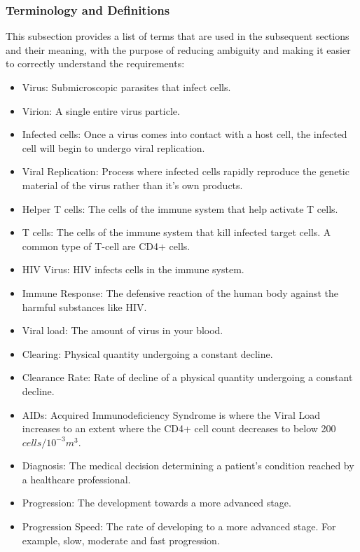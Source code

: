 \documentclass[12pt]{article}
\begin{document}
\subsubsection{Terminology and Definitions}

This subsection provides a list of terms that are used in the subsequent
sections and their meaning, with the purpose of reducing ambiguity and making it
easier to correctly understand the requirements:

\begin{itemize}
\item Virus: Submicroscopic parasites that infect cells. 
\item Virion: A single entire virus particle.
\item Infected cells: Once a virus comes into contact with a host cell, the 
infected cell will begin to undergo viral replication.
\item Viral Replication: Process where infected cells rapidly reproduce the 
genetic material of the virus rather than it’s own 
products\citep{BURRELL201739}.
\item Helper T cells: The cells of the immune system that help activate T cells.
\item T cells: The cells of the immune system that kill infected target cells. A 
common type of T-cell are CD4+ cells.
\citep{william_2018}
\item HIV Virus: HIV infects cells in the immune system.
\item Immune Response: The defensive reaction of the human body against the 
harmful substances like HIV.
\item Viral load:  The amount of virus in your blood.
\item Clearing: Physical quantity undergoing a constant decline.
\item Clearance Rate: Rate of decline of a physical quantity undergoing a constant decline.
\item AIDs: Acquired Immunodeficiency Syndrome is where the Viral Load increases 
to an extent where the  CD4+ cell count decreases to below 200 
$cells/10^{-3}m^3$.\citep{hiv.gov}
\item Diagnosis: The medical decision determining a patient's condition reached 
by a healthcare professional.
\item Progression: The development towards a more advanced stage.
\item Progression Speed: The rate of developing to a more advanced stage. For 
example, slow, moderate and fast progression.
\end{itemize}
\end{document}
